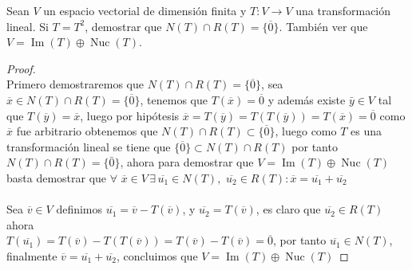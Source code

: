 \documentclass[11pt]{article}
\numberwithin{equation}{section}
\begin{document}
\begin{Problema}{} Sean $V$ un espacio vectorial de dimensión finita y $T: V \to V$ una transformación lineal. 
    Si $T = T^2$, demostrar que $N(T)\cap R(T)=\{\overline{0}\}$. 
    También ver que $V = \operatorname{Im}(T) \oplus \operatorname{Nuc}(T)$.
\end{Problema}
\begin{proof}
    \,\\
    Primero demostraremos que $N(T)\cap R(T)=\{\overline{0}\}$, sea $\overline{x}\in N(T)\cap R(T)=\{\overline{0}\}$, tenemos que $T(\overline{x})=\overline{0}$ y además
    existe $\bar{y}\in V$ tal que $T(\overline{y})=\overline{x}$, luego por hipótesis $\overline{x}=T(\overline{y})=T(T(\overline{y}))=T(\overline{x})=\overline{0}$
    como $\overline{x}$ fue arbitrario obtenemos que $N(T)\cap R(T)\subset\{\overline{0}\}$, luego como $T$ es una transformación lineal se tiene que $\{\overline{0}\}\subset N(T)\cap R(T)$
    por tanto $N(T)\cap R(T)=\{\bar{0}\}$, ahora para demostrar que $V = \operatorname{Im}(T) \oplus \operatorname{Nuc}(T)$ basta demostrar
    que $\forall\,\,\overline{x}\in V\,\exists\,\overline{u_1}\in N(T),\,\,\overline{u_2}\in R(T):\overline{x}=\overline{u_1}+\overline{u_2}$\,\\
    \,\\
    Sea $\overline{v}\in V$ definimos $\overline{u_1}= \overline{v}-T(\overline{v})$, y $\overline{u_2}=T(\overline{v})$, es claro 
    que $\overline{u_2}\in R(T)$ ahora\\ $T(\overline{u_1})=T(\overline{v})-T(T(\overline{v}))=T(\overline{v})-T(\overline{v})=\overline{0}$, por tanto $\overline{u_1}\in N(T)$, finalmente
    $\overline{v}=\overline{u_1}+\overline{u_2}$, concluimos que $V = \operatorname{Im}(T) \oplus \operatorname{Nuc}(T)$
\end{proof}
   
\end{document}
